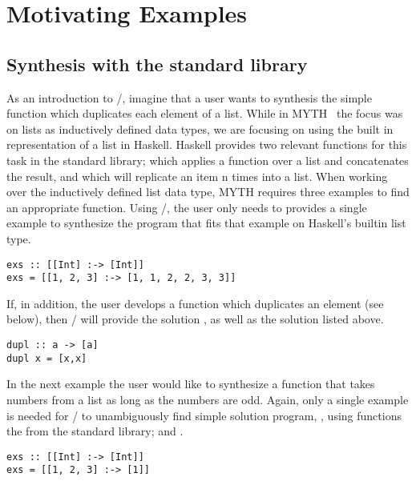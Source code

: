\section{Motivating Examples} 
\label{examples}

\subsection{Synthesis with the standard library}

As an introduction to \ourTool/, imagine that a user wants to synthesis the simple  \cite{Osera:2015} function which duplicates each element of a list.
While in MYTH~\cite{Osera:2015} the focus was on lists as inductively defined data types, we are focusing on using the built in representation of a list in Haskell.
Haskell provides two relevant functions for this task in the standard library;  which applies a function over a list and concatenates the result, and  which will replicate an item n times into a list.
When working over the inductively defined list data type, MYTH requires three examples to find an appropriate function. Using \ourTool/, the user only needs to provides a single example to synthesize the program  that fits that example on Haskell's builtin list type.

\begin{lstlisting}
exs :: [[Int] :-> [Int]]
exs = [[1, 2, 3] :-> [1, 1, 2, 2, 3, 3]]
\end{lstlisting}

If, in addition, the user develops a function  which duplicates an element (see below), then \ourTool/ will provide the solution , as well as the solution listed above.

\begin{lstlisting}
dupl :: a -> [a]
dupl x = [x,x]
\end{lstlisting}

In the next example the user would like to synthesize a function that takes numbers from a list as long as the numbers are odd.
Again, only a single example is needed for \ourTool/ to unambiguously find  simple solution program, , using functions the from the standard library;  and  . 

\begin{lstlisting}
exs :: [[Int] :-> [Int]]
exs = [[1, 2, 3] :-> [1]]
\end{lstlisting}


